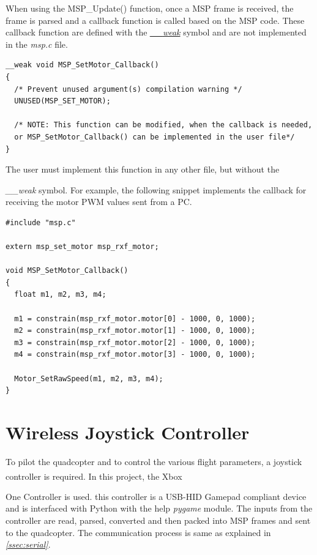 \documentclass[a4paper,12pt,oneside]{book}
\begin{document}
When using the {MSP{\_}Update()} function, once a MSP frame is received, the frame is parsed and a callback function is called based on the MSP code. These callback function are defined with the \href{http://www.keil.com/support/man/docs/armcc/armcc_chr1359124970859.htm}{\textit{{\_\_}weak}} symbol and are not implemented in the \textit{msp.c} file.\\

\begin{verbatim}
__weak void MSP_SetMotor_Callback()
{
  /* Prevent unused argument(s) compilation warning */
  UNUSED(MSP_SET_MOTOR);
  
  /* NOTE: This function can be modified, when the callback is needed,
  or MSP_SetMotor_Callback() can be implemented in the user file*/
}
\end{verbatim}

\bigskip

The user must implement this function in any other file, but without the {\textit{{\_\_}weak} symbol. For example, the following snippet implements the callback for receiving the motor PWM values sent from a PC.\\

\begin{verbatim}
#include "msp.c"

extern msp_set_motor msp_rxf_motor;

void MSP_SetMotor_Callback()
{
  float m1, m2, m3, m4;

  m1 = constrain(msp_rxf_motor.motor[0] - 1000, 0, 1000);
  m2 = constrain(msp_rxf_motor.motor[1] - 1000, 0, 1000);
  m3 = constrain(msp_rxf_motor.motor[2] - 1000, 0, 1000);
  m4 = constrain(msp_rxf_motor.motor[3] - 1000, 0, 1000);

  Motor_SetRawSpeed(m1, m2, m3, m4);
}
\end{verbatim}

\clearpage

\section{Wireless Joystick Controller}
\label{sec:joystick}

To pilot the quadcopter and to control the various flight parameters, a joystick controller is required. In this project, the Xbox\textsuperscript{\textregistered}} One Controller\cite{xbox} is used. this controller is a USB-HID Gamepad compliant device and is interfaced with Python with the help \textit{pygame} module. The inputs from the controller are read, parsed, converted and then packed into MSP frames and sent to the quadcopter. The communication process is same as explained in \textit{\autoref{ssec:serial}}.\\
\end{document}
